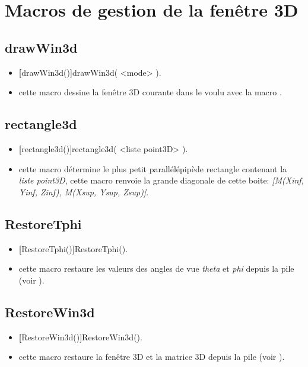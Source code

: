 \section{Macros de gestion de la fenêtre 3D}

\subsection{drawWin3d}
\begin{itemize}
 \item \util \textbf[drawWin3d()]{drawWin3d( <mode> )}.
 \item \desc cette macro dessine la fenêtre 3D courante dans le  voulu avec la macro . 
\end{itemize}

\subsection{rectangle3d}
\begin{itemize}
 \item \util \textbf[rectangle3d()]{rectangle3d( <liste point3D> )}.
 \item \desc cette macro détermine le plus petit parallélépipède rectangle contenant la \textit{liste point3D}, cette macro renvoie la grande diagonale de cette boite: \textsl{[M(Xinf, Yinf, Zinf), M(Xsup, Ysup, Zsup)]}.
\end{itemize}


\subsection{RestoreTphi}\label{macRestoreTphi}
\begin{itemize}
 \item \util \textbf[RestoreTphi()]{RestoreTphi()}.
 \item \desc cette macro restaure les valeurs des angles de vue \textit{theta} et \textit{phi} depuis la pile (voir ).
\end{itemize}


\subsection{RestoreWin3d}\label{macRestoreWin3d}
\begin{itemize}
 \item \util \textbf[RestoreWin3d()]{RestoreWin3d()}.
 \item \desc cette macro restaure la fenêtre 3D et la matrice 3D depuis la pile (voir ). \end{itemize}

